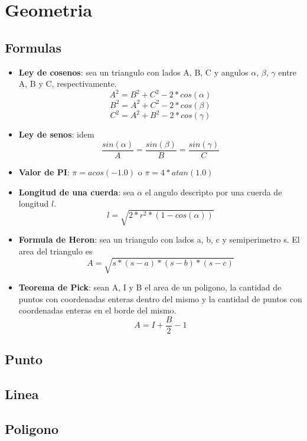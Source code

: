\documentclass[a4paper,11pt,landscape,twocolumn]{article}
\begin{document}
\section{Geometria}

\subsection{Formulas}

\begin{itemize}
  \item \textbf{Ley de cosenos}: sea un triangulo con lados A, B, C y angulos $\alpha$, $\beta$, $\gamma$ entre A, B y C, respectivamente.
  $$A^2=B^2+C^2-2*cos(\alpha)$$
  $$B^2=A^2+C^2-2*cos(\beta)$$
  $$C^2=A^2+B^2-2*cos(\gamma)$$
  \item \textbf{Ley de senos}: idem
  $$\frac{sin(\alpha)}{A}=\frac{sin(\beta)}{B}=\frac{sin(\gamma)}{C}$$
  \item \textbf{Valor de PI}: $\pi=acos(-1.0)$ o $\pi=4*atan(1.0)$
  \item \textbf{Longitud de una cuerda}: sea $\alpha$ el angulo descripto por una cuerda de longitud $l$.
  $$l=\sqrt{2*r^2*(1-cos(\alpha))}$$
  \item \textbf{Formula de Heron}: sea un triangulo con lados a, b, c y semiperimetro s. El area del triangulo es
  $$A=\sqrt{s*(s-a)*(s-b)*(s-c)}$$
  \item \textbf{Teorema de Pick}: sean A, I y B el area de un poligono, la cantidad de puntos con coordenadas enteras dentro del mismo y la cantidad de puntos con coordenadas enteras en el borde del mismo.
  $$A=I+\frac{B}{2}-1$$
\end{itemize}

\subsection{Punto}



\subsection{Linea}



\subsection{Poligono}


\end{document}
